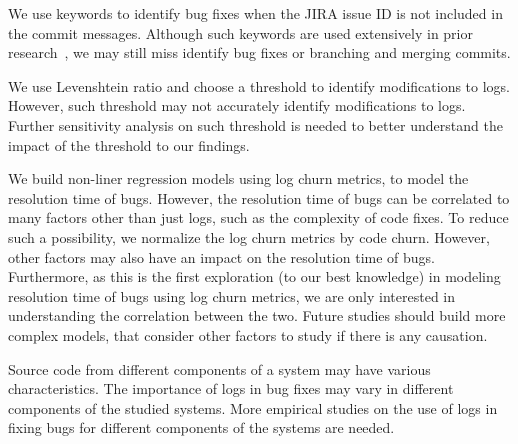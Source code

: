 We use keywords to identify bug fixes when the JIRA issue ID is not included in the commit messages. Although such keywords are used extensively in prior research~\cite{EMSEIAN}, we may still miss identify bug fixes or branching and merging commits. 

We use Levenshtein ratio and choose a threshold to identify modifications to logs. However, such threshold may not accurately identify  modifications to logs. Further sensitivity analysis on such threshold is needed to better understand the impact of the threshold to our findings.

We build non-liner regression models using log churn metrics, to model the resolution time of bugs. However, the resolution time of bugs can be correlated to many factors other than just logs, such as the complexity of code fixes. To reduce such a possibility, we normalize the log churn metrics by code churn. However, other factors may also have an impact on the resolution time of bugs. Furthermore, as this is the first exploration (to our best knowledge) in modeling resolution time of bugs using log churn metrics, we are only interested in understanding the correlation between the two. Future studies should build more complex models, that consider other factors to study if there is any causation. 




Source code from different components of a system may have various characteristics. The importance of logs in bug fixes may vary in different components of the studied systems. More empirical studies on the use of logs in fixing bugs for different components of the systems are needed.



%

